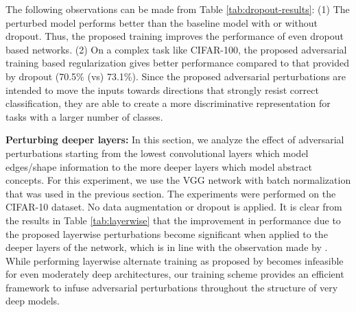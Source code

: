 \documentclass[letterpaper]{article} %
\begin{document}
The following observations can be made from Table \ref{tab:dropout-results}: (1) The perturbed model performs better than the baseline model with or without dropout. Thus, the proposed training improves the performance of even dropout based networks. (2) On a complex task like CIFAR-100, the proposed adversarial training based regularization gives better performance compared to that provided by dropout (70.5\% (vs) 73.1\%). Since the proposed adversarial perturbations are intended to move the inputs towards directions that strongly resist correct classification, they are able to create a more discriminative representation for tasks with a larger number of classes. 

\begin{center}
\label{tab:layerwise}
\end{center}

\textbf{Perturbing deeper layers:} In this section, we analyze the effect of adversarial perturbations starting from the lowest convolutional layers which model edges/shape information to the more deeper layers which model abstract concepts. For this experiment, we use the VGG network with batch normalization that was used in the previous section. The experiments were performed on the CIFAR-10 dataset. No data augmentation or dropout is applied. It is clear from the results in Table \ref{tab:layerwise} that the improvement in performance due to the proposed layerwise perturbations become significant when applied to the deeper layers of the network, which is in line with the observation made by \cite{szegedy2013intriguing}. While performing layerwise alternate training as proposed by\cite{szegedy2013intriguing}  becomes infeasible for even moderately deep architectures, our training scheme provides an efficient framework to infuse adversarial perturbations throughout the structure of very deep models. 
\end{document}
